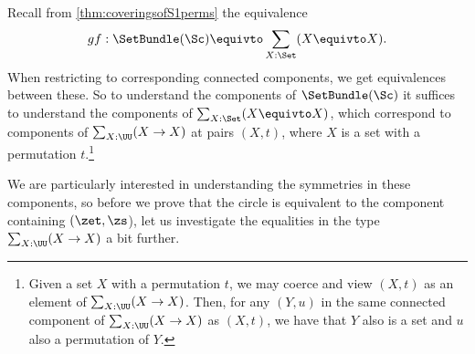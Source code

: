 Recall from \cref{thm:coveringsofS1perms}
the equivalence
\[
gf: \SetBundle(\Sc) \equivto \sum_{X:\Set}(X\equivto X).
\]
When restricting to corresponding connected components,
we get equivalences between these.
So to understand the components of $\SetBundle(\Sc)$
it suffices to understand the components of
$\sum_{X:\Set}(X\equivto X)$, which correspond to
components of $\sum_{X:\UU}(X \to X)$ at pairs $(X,t)$,
where $X$ is a set with a permutation $t$.\footnote{%
Given a set $X$ with a permutation $t$,
we may coerce and view $(X,t)$ as an element of $\sum_{X:\UU}(X\to X)$.
Then, for any $(Y,u)$ in the same connected component of
$\sum_{X:\UU}(X\to X)$ as $(X,t)$, we have that $Y$ also
is a set and $u$ also a permutation of $Y$.
}

We are particularly interested in understanding the symmetries
in these components, so before we prove that the circle is equivalent
to the component containing $(\zet,\zs$), let us investigate the
equalities in the type $\sum_{X:\UU}(X \to X)$ a bit further.

